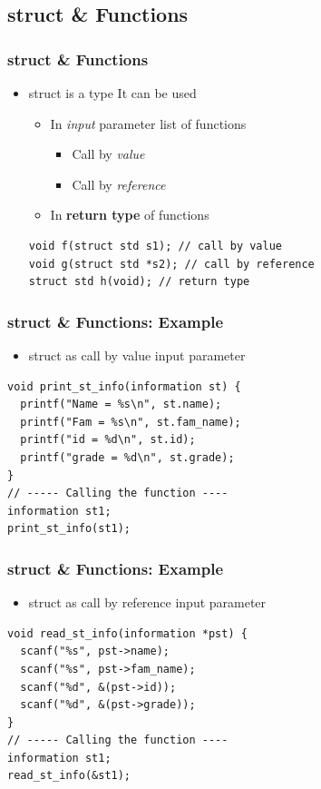 \documentclass{../c-lecture}
\begin{document}
\subsection{struct \& Functions}

\begin{frame}[fragile]
  \frametitle{struct \& Functions}
  \begin{itemize}
    \item struct is a type \textrightarrow It can be used
    \begin{itemize}
      \item
        In \textit{\color{YellowOrange} input} parameter list of functions

      \begin{itemize}
        \item Call by \textit{\color{LimeGreen} value}
        \item Call by \textit{\color{LimeGreen} reference}
      \end{itemize}
      \item In \textbf{\color{YellowOrange} return type} of functions
    \end{itemize}
    \begin{verbatim}
void f(struct std s1); // call by value
void g(struct std *s2); // call by reference
struct std h(void); // return type
    \end{verbatim}
  \end{itemize}
\end{frame}

\begin{frame}[fragile]
  \frametitle{struct \& Functions: Example}
  \begin{itemize}
    \item struct as call by value input parameter
  \end{itemize}
  \begin{verbatim}
void print_st_info(information st) {
  printf("Name = %s\n", st.name);
  printf("Fam = %s\n", st.fam_name);
  printf("id = %d\n", st.id);
  printf("grade = %d\n", st.grade);
}
// ----- Calling the function ----
information st1;
print_st_info(st1);
  \end{verbatim}
\end{frame}

\begin{frame}[fragile]
  \frametitle{struct \& Functions: Example}
  \begin{itemize}
    \item struct as call by reference input parameter
  \end{itemize}
  \begin{verbatim}
void read_st_info(information *pst) {
  scanf("%s", pst->name);
  scanf("%s", pst->fam_name);
  scanf("%d", &(pst->id));
  scanf("%d", &(pst->grade));
}
// ----- Calling the function ----
information st1;
read_st_info(&st1);
  \end{verbatim}
\end{frame}
\end{document}
